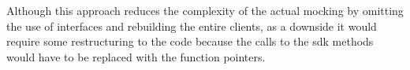 Although this approach reduces the complexity of the actual mocking by omitting the use of interfaces and rebuilding the entire clients, as a downside it would require some restructuring to the code because the calls to the \ac{sdk} methods would have to be replaced with the function pointers.

